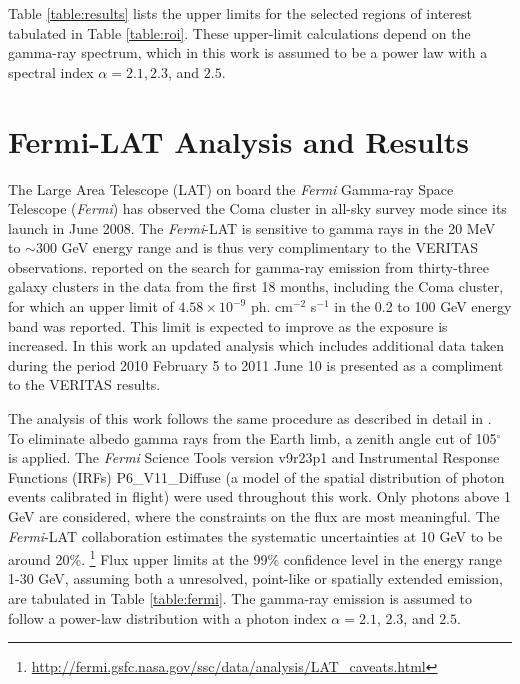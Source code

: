 \documentclass[12pt,manuscript]{aastex}
\begin{document}
Table \ref{table:results} lists the upper limits for the selected regions of interest tabulated in
Table \ref{table:roi}. These upper-limit calculations depend on the gamma-ray spectrum, which in
this work is assumed to be a power law with a spectral index $\alpha=2.1, 2.3$, and $2.5$.

%
%

\section{Fermi-LAT Analysis and Results}
The Large Area Telescope (LAT) on board the \emph{Fermi} Gamma-ray Space Telescope (\emph{Fermi})
has observed the Coma cluster in all-sky survey mode since its launch in June 2008. The
\emph{Fermi}-LAT is sensitive to gamma rays in the 20 MeV to $\sim$300 GeV energy range and is thus
very complimentary to the VERITAS observations. \citet{article:Ackermann_etal:2010} reported on the
search for gamma-ray emission from thirty-three galaxy clusters in the data from the first 18
months, including the Coma cluster, for which an upper limit of $4.58\times 10^{-9}$ ph. cm$^{-2}$
s$^{-1}$ in the 0.2 to 100 GeV energy band was reported. This limit is expected to improve as the
exposure is increased. In this work an updated analysis which includes additional data taken during
the period 2010 February 5 to 2011 June 10 is presented as a compliment to the VERITAS results.

The analysis of this work follows the same procedure as described in detail in
\citet{article:Abdo_etal:2009}. To eliminate albedo gamma rays from the Earth limb, a zenith angle
cut of 105$^{\circ}$ is applied. The \emph{Fermi} Science Tools version v9r23p1 and Instrumental
Response Functions (IRFs) P6\_V11\_Diffuse (a model of the spatial distribution of photon events
calibrated  in flight) were used throughout this work. Only photons above 1 GeV are considered,
where the constraints on the flux are most meaningful. The \emph{Fermi}-LAT collaboration estimates
the systematic uncertainties at 10 GeV to be around 20\%.
\footnote{\url{http://fermi.gsfc.nasa.gov/ssc/data/analysis/LAT\_caveats.html}} Flux upper limits
at the 99\% confidence level in the energy range 1-30 GeV, assuming both a unresolved, point-like
or spatially extended emission, are tabulated in Table \ref{table:fermi}. The gamma-ray emission is
assumed to follow a power-law distribution with a photon index $\alpha=2.1$, 2.3, and $2.5$.

%
%
\end{document}
